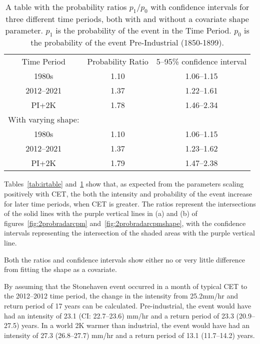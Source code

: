 \begin{table}[H]
   \centering
    \begin{tabular}{c c c}
        Time Period & Probability Ratio & 5--95\% confidence interval \\
        1980s & 1.10 & 1.06--1.15 \\
        2012--2021 & 1.37 & 1.22--1.61 \\
        PI+2K & 1.78 & 1.46--2.34 \\
        With varying shape: && \\
        1980s & 1.10 & 1.06--1.15 \\
        2012--2021 & 1.37 & 1.23--1.62 \\
        PI+2K & 1.79 & 1.47--2.38 \\
    \end{tabular}
    \caption[A table with the probability ratios.]{A table with the probability ratios $p_1/p_0$ with confidence intervals for three different time periods,
        both with and without a covariate shape parameter.
    $p_1$ is the probability of the event in the Time Period.
    $p_0$ is the probability of the event Pre-Industrial (1850-1899).}
    \label{tab:prtable}
\end{table}

Tables~\ref{tab:irtable} and~\ref{tab:prtable} show that,
    as expected from the parameters scaling positively with CET,
    the both the intensity and probability of the event increase for later time periods,
    when CET is greater.
The ratios represent the intersections of the solid lines with the purple vertical lines in (a) and (b)
    of figures~\ref{fig:2probradarcpm} and~\ref{fig:2probradarcpmshape},
    with the confidence intervals representing the intersection of the shaded areas with the purple vertical line.

Both the ratios and confidence intervals show either no or very little difference from fitting the shape as a covariate.

By assuming that the Stonehaven event occurred in a month of typical CET to the 2012--2012 time period,
    the change in the intensity from 25.2mm/hr and return period of 17 years can be calculated.
Pre-industrial,
    the event would have had an intensity of 23.1 (CI: 22.7--23.6) mm/hr and a return period
    of 23.3 (20.9--27.5) years.
In a world 2K warmer than industrial,
     the event would have had an intensity of 27.3 (26.8--27.7) mm/hr and a return period
    of 13.1 (11.7--14.2) years.

